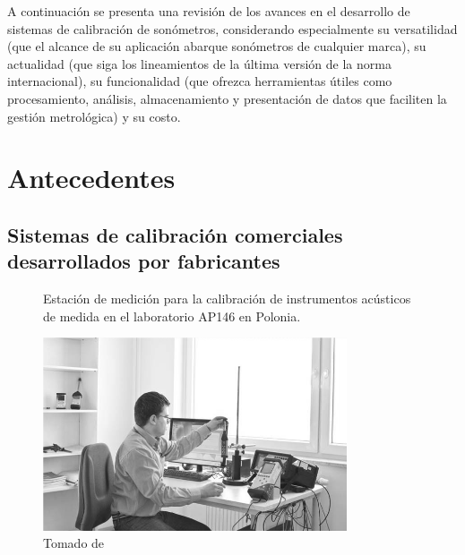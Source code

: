 A continuación se presenta una revisión de los avances en el desarrollo de sistemas de calibración de sonómetros,
considerando especialmente su versatilidad (que el alcance de su aplicación abarque sonómetros de cualquier marca), su
actualidad (que siga los lineamientos de la última versión de la norma internacional), su funcionalidad (que ofrezca
herramientas útiles como procesamiento, análisis, almacenamiento y presentación de datos que faciliten la gestión
metrológica) y su costo.


\section{Antecedentes}

\subsection{Sistemas de calibración comerciales desarrollados por fabricantes}
\begin{figure}[!h]
    \caption{Estación de medición para la calibración de instrumentos acústicos de medida en el laboratorio AP146 en
    Polonia.}
    \label{fig:AP146Laboratory}
    \centering
    \includegraphics[width=0.8\textwidth]{1_Intro/AP146Laboratory}
    \caption*{\footnotesize Tomado de~\cite{Podgorski2016}}
\end{figure}

